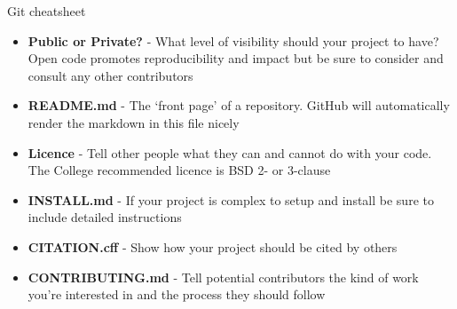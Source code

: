 \documentclass[9pt]{extarticle}
\def\itempad{-1pt}
\begin{document}
\thispagestyle{empty}

\begin{center}
  {\LARGE
  Git cheatsheet}
\end{center}

\begin{bluebox}[title=Things to think when publishing code]
  \begin{itemize}
    \itemsep\itempad
  \item \textbf{Public or Private?} - What level of visibility should your
    project to have? Open code promotes reproducibility and impact but be sure
    to consider and consult any other contributors
  \item \textbf{README.md} - The `front page' of a repository. GitHub will
    automatically render the markdown in this file nicely
  \item \textbf{Licence} - Tell other people what they can and cannot do with
    your code. The College recommended licence is BSD 2- or 3-clause
  \item \textbf{INSTALL.md} - If your project is complex to setup and install be
    sure to include detailed instructions
  \item \textbf{CITATION.cff} - Show how your project should be cited by others
  \item \textbf{CONTRIBUTING.md} - Tell potential contributors the kind of work
    you're interested in and the process they should follow
  \end{itemize}
\end{bluebox}
\end{document}
